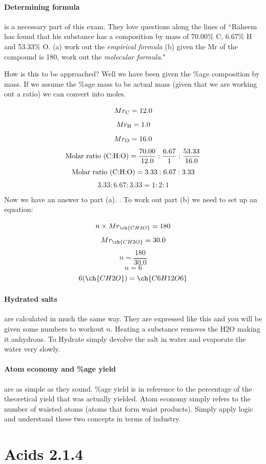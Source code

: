 \documentclass[11pt,a4paper]{memoir}
\begin{document}
    \paragraph{Determining formula} is a necessary part of this exam. They love questions along the lines of ``Raheem has found that his substance has a composition by mass of 70.00\% C, 6.67\% H and 53.33\% O. (a) work out the \textit{empirical formula} (b) given the Mr of the compound is 180, work out the \textit{molecular formula}."
    
    How is this to be approached? Well we have been given the \%age composition by mass. If we assume the \%age mass to be actual mass (given that we are working out a ratio) we can convert into moles.
    
    \[Mr_\textnormal{C} = 12.0\]
    \[Mr_\textnormal{H} = 1.0\]
    \[Mr_\textnormal{O} = 16.0\]
    \[\textnormal{Molar ratio (C:H:O)} = \frac{70.00}{12.0} : \frac{6.67}{1} : \frac{53.33}{16.0}\]
    \[\textnormal{Molar ratio (C:H:O)} = 3.33 : 6.67 : 3.33\]
    \[3.33 : 6.67 : 3.33 = 1 : 2 : 1\]
    
    Now we have an answer to part (a). . To work out part (b) we need to set up an equation:
    
    \[n \times Mr_{\ch{CH2O}} = 180\]
    \[Mr_{\ch{CH2O}} = 30.0\]
    \[n = \frac{180}{30.0}\]
    \[n = 6\]
    \[6(\ch{CH2O}) = \ch{C6H12O6}\]
    
    \paragraph{Hydrated salts} are calculated in much the same way. They are expressed like this  and you will be given some numbers to workout $n$. Heating a substance removes the H2O making it anhydrous. To Hydrate simply devolve the salt in water and evaporate the water very slowly.
    
    \paragraph{Atom economy and \%age yield} are as simple as they sound. \%age yield is in reference to the percentage of the theoretical yield that was actually yielded. Atom economy simply refers to the number of waisted atoms (atoms that form waist products). Simply apply logic and understand these two concepts in terms of industry.
    
\section{Acids 2.1.4}
\end{document}
